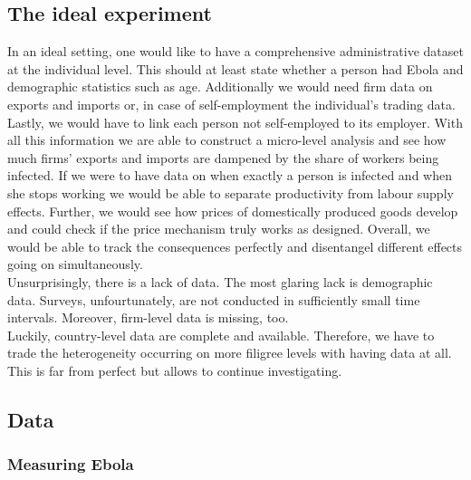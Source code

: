 \documentclass{article}
\begin{document}
\subsection{The ideal experiment}
In an ideal setting, one would like to have a comprehensive administrative dataset at the individual level. This should at least state whether a person had Ebola and demographic statistics such as age. Additionally we would need firm data on exports and imports or, in case of self-employment the individual's trading data. Lastly, we would have to link each person not self-employed to its employer. With all this information we are able to construct a micro-level analysis and see how much firms' exports and imports are dampened by the share of workers being infected. If we were to have data on when exactly a person is infected and when she stops working we would be able to separate productivity from labour supply effects. Further, we would see how prices of domestically produced goods develop and could check if the price mechanism truly works as designed. Overall, we would be able to track the consequences perfectly and disentangel different effects going on simultaneously.\\
Unsurprisingly, there is a lack of data. The most glaring lack is demographic data. Surveys, unfourtunately, are not conducted in sufficiently small time intervals. Moreover, firm-level data is missing, too. \\
Luckily, country-level data are complete and available. Therefore, we have to trade the heterogeneity occurring on more filigree levels with having data at all. This is far from perfect but allows to continue investigating.\\

\subsection{Data}

\subsubsection{Measuring Ebola}
\end{document}
